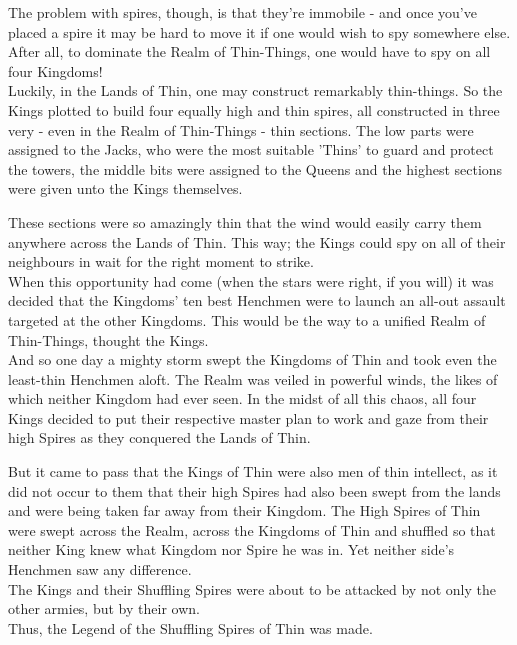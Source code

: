 \documentclass[11pt,twocolumn]{article}
\begin{document}
\noindent
The problem with spires, though, is that they’re immobile - and once you’ve placed a spire it may be hard to move it if one would wish to spy somewhere else. After all, to dominate the Realm of Thin-Things, one would have to spy on all four Kingdoms! \\

\noindent
Luckily, in the Lands of Thin, one may construct remarkably thin-things. So the Kings plotted to build four equally high and thin spires, all constructed in three very - even in the Realm of Thin-Things - thin sections. The low parts were assigned to the Jacks, who were the most suitable 'Thins' to guard and protect the towers, the middle bits were assigned to the Queens and the highest sections were given unto the Kings themselves.

\noindent
These sections were so amazingly thin that the wind would easily carry them anywhere across the Lands of Thin. This way; the Kings could spy on all of their neighbours in wait for the right moment to strike. \\

\noindent
When this opportunity had come (when the stars were right, if you will) it was decided that the Kingdoms’ ten best Henchmen were to launch an all-out assault targeted at the other Kingdoms. This would be the way to a unified Realm of Thin-Things, thought the Kings. \\
And so one day a mighty storm swept the Kingdoms of Thin and took even the least-thin Henchmen aloft. The Realm was veiled in powerful winds, the likes of which neither Kingdom had ever seen. In the midst of all this chaos, all four Kings decided to put their respective master plan to work and gaze from their high Spires as they conquered the Lands of Thin.

\noindent
But it came to pass that the Kings of Thin were also men of thin intellect, as it did not occur to them that their high Spires had also been swept from the lands and were being taken far away from their Kingdom. The High Spires of Thin were swept across the Realm, across the Kingdoms of Thin and shuffled so that neither King knew what Kingdom nor Spire he was in.
Yet neither side's Henchmen saw any difference. \\
\noindent
The Kings and their Shuffling Spires were about to be attacked by not only the other armies, but by their own. \\

\noindent Thus, the Legend of the Shuffling Spires of Thin was made. \\
\end{document}
